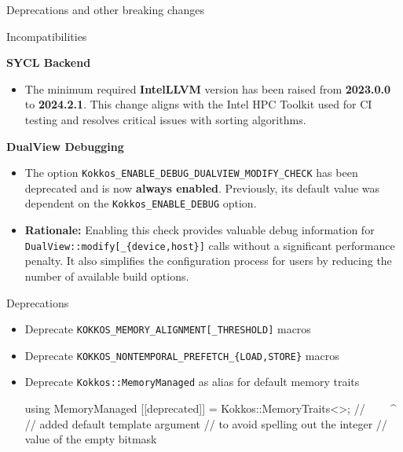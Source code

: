 
\begin{frame}[fragile]

  {\Huge Deprecations and other breaking changes}

  \vspace{10pt}

\end{frame}


\begin{frame}[fragile]{Incompatibilities}

  \textbf{SYCL Backend}
  \begin{itemize}
      \item The minimum required \textbf{IntelLLVM} version has been raised from \textbf{2023.0.0} to \textbf{2024.2.1}.
      This change aligns with the Intel HPC Toolkit used for CI testing and
      resolves critical issues with sorting algorithms.
  \end{itemize}
  \textbf{DualView Debugging}
  \begin{itemize}
    \item The option \texttt{Kokkos\_ENABLE\_DEBUG\_DUALVIEW\_MODIFY\_CHECK} has
        been deprecated and is now \textbf{always enabled}. Previously, its default
        value was dependent on the \texttt{Kokkos\_ENABLE\_DEBUG} option.
    \item \textbf{Rationale:} Enabling this check provides valuable debug information
        for \texttt{DualView::modify[\_\{device,host\}]} calls without a
        significant performance penalty. It also simplifies the configuration
        process for users by reducing the number of available build options.
  \end{itemize}
\end{frame}


\begin{frame}[fragile]{Deprecations}
  \begin{itemize}
    \item Deprecate \texttt{KOKKOS\_MEMORY\_ALIGNMENT[\_THRESHOLD]} macros
    \item Deprecate \texttt{KOKKOS\_NONTEMPORAL\_PREFETCH\_\{LOAD,STORE\}} macros
    \item Deprecate \texttt{Kokkos::MemoryManaged} as alias for default memory traits
\begin{code}[keywords={MemoryManaged}]
using MemoryManaged [[deprecated]] = Kokkos::MemoryTraits<>;
//                                   ^^^^^^^^^^^^^^^^^^^^^^
//                                   added default template argument
//                                   to avoid spelling out the integer
//                                   value of the empty bitmask
\end{code}
  \end{itemize}
\end{frame}
